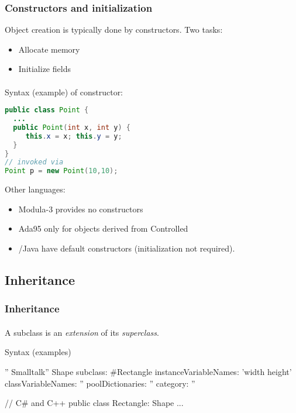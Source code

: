 \documentclass{beamer}
\begin{document}
\begin{frame}[fragile]
\frametitle{Constructors and initialization}
Object creation is typically done by constructors. Two tasks:
\begin{itemize}
\item Allocate memory 
\item Initialize fields

\end{itemize}
\framesubtitle{}
\bigskip

Syntax (example) of constructor:
\begin{center}
\begin{lstlisting}[language=Java, basicstyle=\small\ttfamily, commentstyle=\scriptsize]
public class Point {
  ...
  public Point(int x, int y) {
     this.x = x; this.y = y;
  } 
}
// invoked via
Point p = new Point(10,10);
\end{lstlisting}
\end{center}
Other languages:
\begin{itemize}
\item Modula-3 provides no constructors
\item Ada95 only for objects derived from Controlled
\item \Cpp/Java have default constructors (initialization not required).
\end{itemize}
\end{frame}


\subsection{Inheritance}



\begin{frame}[fragile]
\frametitle{Inheritance}
\framesubtitle{}

\begin{center}
  A subclass is an \emph{extension} of its \emph{superclass}.
\end{center}

\bigskip

Syntax (examples)

\begin{cplus3}
   '' Smalltalk''
    Shape subclass: #Rectangle
        instanceVariableNames: 'width height'
        classVariableNames: ''
        poolDictionaries: ''
        category: ''

     // C# and C++
     public class Rectangle: Shape {
        ... 
     }
\end{cplus3}


\end{frame}
\end{document}
